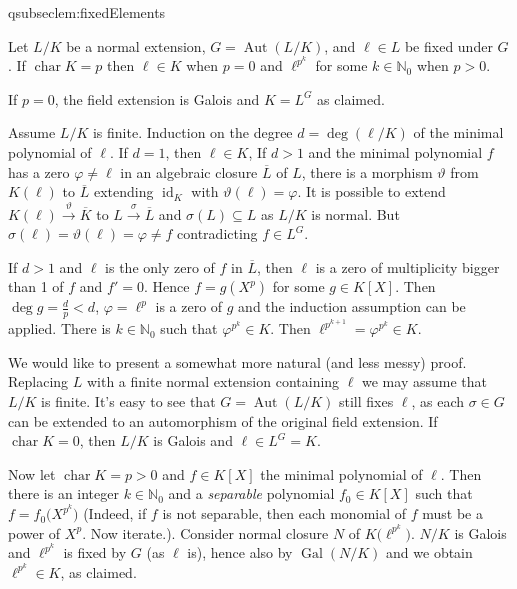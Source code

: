 \documentclass[DIV=14,parskip=full,pointednumbers]{scrartcl}
\renewcommand{\phi}{\varphi}
\theoremstyle{cthm}
\theoremstyle{cvarthm}
\renewenvironment{proof}[1][\proofname]
{\pushQED{\qed}\topsep0pt \partopsep0pt\trivlist\item[\hskip\labelsep\itshape #1.] }{\popQED\endtrivlist\addvspace{6pt plus 6pt}}
\theoremstyle{cdef}
\newcommand{\lbl}[1]{
	\label{#1}
	\ifmmode
	\expandafter\xdef\csname eqsubsec#1\endcsname{\thesubsection}
	\fi
}
\newcommand{\IN}{\mathbb{N}}
\newcommand{\Aut}{\operatorname{Aut}}
\newcommand{\Gal}{\operatorname{Gal}}
\newcommand{\id}{\operatorname{id}}
\newcommand{\cha}{\operatorname{char}}
\newcommand{\longto}{\longrightarrow}
\newcommand{\ov}{\overline}
\newcommand{\morphism}[1][]{\overset{#1}{\longto}}
\renewcommand{\phi}{\varphi}
\begin{document}
	\begin{lem}\lbl{lem:fixedElements}
		Let $L/K$ be a normal extension, $G=\Aut(L/K)$, and $\ell\in L$ be fixed under $G$. If $\cha K = p$ then $\ell\in K$ when $p=0$ and $\ell^{p^k}$ for some $k\in\IN_0$ when $p>0$.
	\end{lem}
	\begin{proof}[First proof]
		If $p=0$, the field extension is Galois and $K=L^G$ as claimed. 
		
		Assume $L/K$ is finite. Induction on the degree $d=\deg(\ell/K)$ of the minimal polynomial of $\ell$. If $d=1$, then $\ell\in K$, If $d>1$ and the minimal polynomial $f$ has a zero $\phi\neq \ell$ in an algebraic closure $\ov L$ of $L$, there is a morphism $\vartheta$ from $K(\ell)$ to $\ov L$ extending $\id_K$ with $\vartheta(\ell) =\phi$. It is possible to extend $K(\ell)\morphism[\vartheta] \ov K$ to $L\morphism[\sigma] \ov L$ and $\sigma(L) \subseteq L$ as $L/K$ is normal. But $\sigma(\ell) = \vartheta(\ell) = \phi\neq f$ contradicting $f\in L^G$.
		
		If $d>1$ and $\ell$ is the only zero of $f$ in $\ov L$, then $\ell$ is a zero of multiplicity bigger than 1 of $f$ and $f'=0$. Hence $f=g(X^p)$ for some $g\in K[X]$. Then $\deg g = \frac{d}{p}<d$, $\phi =\ell^p$ is a zero of $g$ and the induction assumption can be applied. There is $k\in\IN_0$ such that $\phi^{p^k}\in K$. Then $\ell^{p^{k+1}} = \phi^{p^k} \in K$.
	\end{proof}
	\begin{proof}[Second proof]
		We would like to present a somewhat more natural (and less messy) proof. Replacing $L$ with a finite normal extension containing $\ell$ we may assume that $L/K$ is finite. It's easy to see that $G=\Aut(L/K)$ still fixes $\ell$, as each $\sigma\in G$ can be extended to an automorphism of the original field extension. If $\cha K=0$, then $L/K$ is Galois and $\ell\in L^G=K$.
		
		Now let $\cha K=p>0$ and $f\in K[X]$ the minimal polynomial of $\ell$. Then there is an integer $k\in\IN_0$ and a \emph{separable} polynomial $f_0\in K[X]$ such that $f=f_0\big(X^{p^k}\big)$ (Indeed, if $f$ is not separable, then each monomial of $f$ must be a power of $X^p$. Now iterate.). Consider normal closure $N$ of $K\big(\ell^{p^k}\big)$. $N/K$ is Galois and $\ell^{p^k}$ is fixed by $G$ (as $\ell$ is), hence also by $\Gal(N/K)$ and we obtain $\ell^{p^k}\in K$, as claimed.
	\end{proof}
\end{document}
